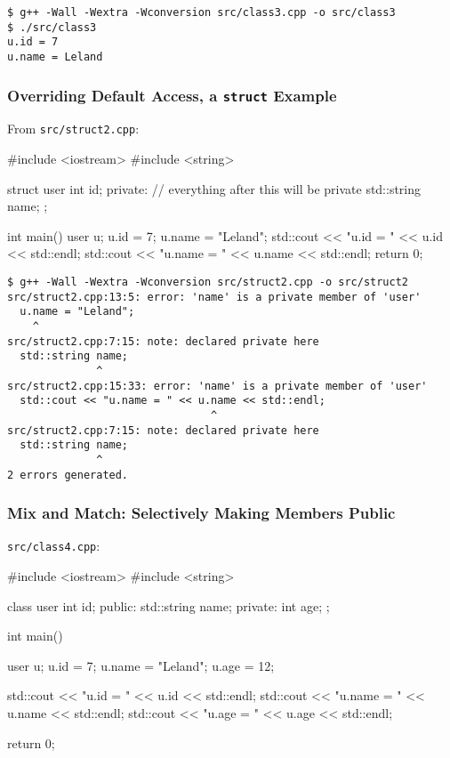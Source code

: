 \documentclass[12pt,letterpaper,twoside]{article}
\begin{document}
\begin{verbatim}
$ g++ -Wall -Wextra -Wconversion src/class3.cpp -o src/class3
$ ./src/class3
u.id = 7
u.name = Leland
\end{verbatim}

\subsubsection{Overriding Default Access, a \texttt{struct} Example}

From \texttt{src/struct2.cpp}:
\begin{cpp}
#include <iostream>
#include <string>

struct user {
  int id;
 private: // everything after this will be private
  std::string name;
};

int main() {
  user u;
  u.id = 7;
  u.name = "Leland";
  std::cout << "u.id = " << u.id << std::endl;
  std::cout << "u.name = " << u.name << std::endl;
  return 0;
}
\end{cpp}

\begin{verbatim}
$ g++ -Wall -Wextra -Wconversion src/struct2.cpp -o src/struct2
src/struct2.cpp:13:5: error: 'name' is a private member of 'user'
  u.name = "Leland";
    ^
src/struct2.cpp:7:15: note: declared private here
  std::string name;
              ^
src/struct2.cpp:15:33: error: 'name' is a private member of 'user'
  std::cout << "u.name = " << u.name << std::endl;
                                ^
src/struct2.cpp:7:15: note: declared private here
  std::string name;
              ^
2 errors generated.
\end{verbatim}

\subsubsection{Mix and Match: Selectively Making Members Public}
\texttt{src/class4.cpp}:

\begin{cpp}
#include <iostream>
#include <string>

class user {
  int id;
 public:
  std::string name;
 private:
  int age;
};

int main() {
  user u;
  u.id = 7;
  u.name = "Leland";
  u.age = 12;

  std::cout << "u.id = " << u.id << std::endl;
  std::cout << "u.name = " << u.name << std::endl;
  std::cout << "u.age = " << u.age << std::endl;

  return 0;
}
\end{cpp}
\end{document}
